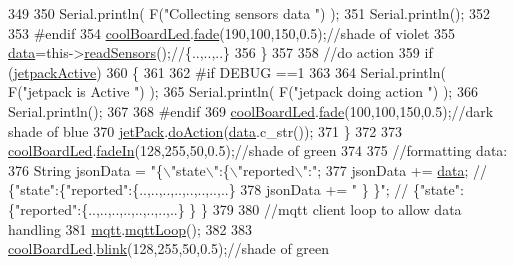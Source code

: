 \begin{DoxyCode}
349 
350         Serial.println( F(\textcolor{stringliteral}{"Collecting sensors data "}) );
351         Serial.println();
352     
353 \textcolor{preprocessor}{    #endif}
354         \hyperlink{classCoolBoard_a1b1d3c684a5baa56b08486e192fd8e97}{coolBoardLed}.\hyperlink{classCoolBoardLed_af1cacbaa88db8bcf6042c1083ba41155}{fade}(190,100,150,0.5);\textcolor{comment}{//shade of violet        }
355         \hyperlink{classCoolBoard_a427fb753dd8575bdf821c70a5c63d695}{data}=this->\hyperlink{classCoolBoard_ad03abdce2e65f520bbf2cff0f2d083cf}{readSensors}();\textcolor{comment}{//\{..,..,..\}}
356     \}
357     
358     \textcolor{comment}{//do action}
359     \textcolor{keywordflow}{if} (\hyperlink{classCoolBoard_a9be03a913d26e558328935ca3b59a75e}{jetpackActive})
360     \{
361     
362 \textcolor{preprocessor}{    #if DEBUG ==1}
363 
364         Serial.println( F(\textcolor{stringliteral}{"jetpack is Active "}) );
365         Serial.println( F(\textcolor{stringliteral}{"jetpack doing action "}) );
366         Serial.println();
367 
368 \textcolor{preprocessor}{    #endif}
369         \hyperlink{classCoolBoard_a1b1d3c684a5baa56b08486e192fd8e97}{coolBoardLed}.\hyperlink{classCoolBoardLed_af1cacbaa88db8bcf6042c1083ba41155}{fade}(100,100,150,0.5);\textcolor{comment}{//dark shade of blue     }
370         \hyperlink{classCoolBoard_a30b1357881b01ccbec676856a91e48e9}{jetPack}.\hyperlink{classJetpack_a9e703197093094b963f9ad57817495b8}{doAction}(\hyperlink{classCoolBoard_a427fb753dd8575bdf821c70a5c63d695}{data}.c\_str());
371     \}
372     
373     \hyperlink{classCoolBoard_a1b1d3c684a5baa56b08486e192fd8e97}{coolBoardLed}.\hyperlink{classCoolBoardLed_ab778f5e7bed0ab74e3906d82110493c3}{fadeIn}(128,255,50,0.5);\textcolor{comment}{//shade of green}
374 
375     \textcolor{comment}{//formatting data:}
376     String jsonData = \textcolor{stringliteral}{"\{\(\backslash\)"state\(\backslash\)":\{\(\backslash\)"reported\(\backslash\)":"};
377     jsonData += \hyperlink{classCoolBoard_a427fb753dd8575bdf821c70a5c63d695}{data}; \textcolor{comment}{// \{"state":\{"reported":\{..,..,..,..,..,..,..,..\}}
378     jsonData += \textcolor{stringliteral}{" \} \}"}; \textcolor{comment}{// \{"state":\{"reported":\{..,..,..,..,..,..,..,..\}  \} \}}
379     
380     \textcolor{comment}{//mqtt client loop to allow data handling}
381     \hyperlink{classCoolBoard_a2399f44d7c23c1149a335cb3b46d90f1}{mqtt}.\hyperlink{classCoolMQTT_aa5eaae967b562b62cbcf2b8d81f6e5d5}{mqttLoop}();
382 
383     \hyperlink{classCoolBoard_a1b1d3c684a5baa56b08486e192fd8e97}{coolBoardLed}.\hyperlink{classCoolBoardLed_a96e1ea13003eee34c9dbcef340404426}{blink}(128,255,50,0.5);\textcolor{comment}{//shade of green    }

\end{DoxyCode}
